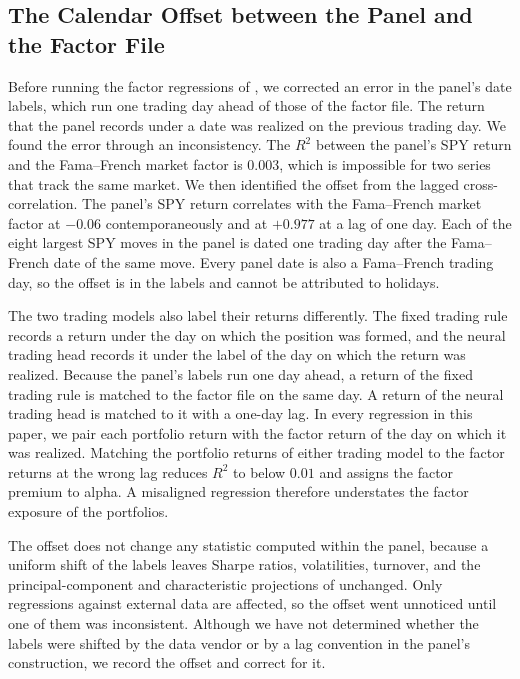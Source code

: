 \subsection{The Calendar Offset between the Panel and the Factor File}
\label{app:calendar}

Before running the factor regressions of , we corrected an error in the panel's date labels, which
run one trading day ahead of those of the factor file. The return that the panel records under a date was
realized on the previous trading day. We found the error through an
inconsistency. The $R^2$ between the panel's SPY return and the Fama--French market factor is $0.003$, which is impossible for two series that track the same market. We then identified the offset from the lagged cross-correlation. The panel's SPY return correlates with the Fama--French market factor at
$-0.06$ contemporaneously and at $+0.977$ at a lag of one day. Each
of the eight largest SPY moves in the panel is dated one trading day
after the Fama--French date of the same move. Every panel date is also
a Fama--French trading day, so the offset is in the labels and cannot be attributed to holidays.

The two trading models also label their returns differently. The fixed trading rule records a return under the day on which the position was formed, and the neural trading head records it under the label of the day on which the return was realized. Because the panel's labels run one day ahead, a return of the fixed trading rule is matched to the factor file on the same day. A return of the neural trading head is matched to it with a one-day lag. In every regression in
this paper, we pair each portfolio return with the factor return of
the day on which it was realized. Matching the portfolio returns of either trading model to the factor returns at the wrong
lag reduces $R^2$ to below $0.01$ and assigns the factor premium
to alpha. A misaligned regression therefore understates the factor exposure of the portfolios.

The offset does not change any statistic computed within the panel, because a uniform shift of the labels leaves Sharpe ratios, volatilities,
turnover, and the principal-component and characteristic projections of  unchanged. Only
regressions against external data are affected, so the offset went unnoticed until one of them
was inconsistent. Although we have not determined whether the labels were shifted by the data
vendor or by a lag convention in the panel's construction, we record the offset and correct for it.

